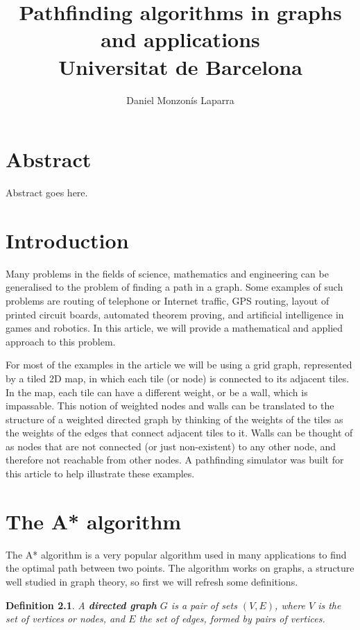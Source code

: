 \documentclass[12pt]{report}
\title{
{Pathfinding algorithms in graphs and applications}\\
{\large Universitat de Barcelona}
}
\author{Daniel Monzonís Laparra}
\newtheorem{definition}[theorem]{Definition}
\begin{document}
\maketitle

\chapter*{Abstract}
Abstract goes here.

\tableofcontents

\chapter{Introduction}
Many problems in the fields of science, mathematics and engineering can be generalised to the problem of finding a path in a graph. Some examples of such problems are routing of telephone or Internet traffic, GPS routing, layout of printed circuit boards, automated theorem proving, and artificial intelligence in games and robotics. In this article, we will provide a mathematical and applied approach to this problem.

For most of the examples in the article we will be using a grid graph, represented by a tiled 2D map, in which each tile (or node) is connected to its adjacent tiles. In the map, each tile can have a different weight, or be a wall, which is impassable. This notion of weighted nodes and walls can be translated to the structure of a weighted directed graph by thinking of the weights of the tiles as the weights of the edges that connect adjacent tiles to it. Walls can be thought of as nodes that are not connected (or just non-existent) to any other node, and therefore not reachable from other nodes. A pathfinding simulator was built for this article to help illustrate these examples.

\chapter{The A* algorithm}
The A* algorithm is a very popular algorithm used in many applications to find the optimal path between two points. The algorithm works on graphs, a structure well studied in graph theory, so first we will refresh some definitions.

\begin{definition}
A \textbf{directed graph} $G$ is a pair of sets $(V, E)$, where $V$ is the set of vertices or nodes, and $E$ the set of edges, formed by pairs of vertices.
\end{definition}
\end{document}
